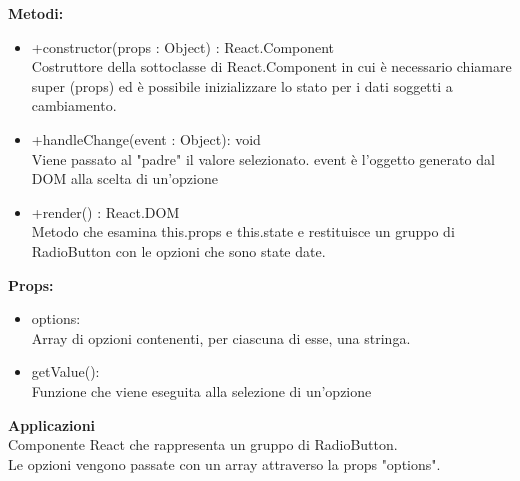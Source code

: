\textbf{Metodi:} 
\begin{itemize}
\item +constructor(props : Object) : React.Component 
\\
Costruttore della sottoclasse di React.Component in cui è necessario chiamare super (props) ed è possibile inizializzare lo stato per i dati soggetti a cambiamento.

\item +handleChange(event : Object): void 
\\
Viene passato al "padre" il valore selezionato. event è l'oggetto generato dal DOM alla scelta di un'opzione

\item +render() : React.DOM 
\\
Metodo che esamina this.props e this.state e restituisce un gruppo di RadioButton con le opzioni che sono state date.

\end{itemize}

\textbf{Props:} 
\begin{itemize}
\item options: 
\\
Array di opzioni contenenti, per ciascuna di esse, una stringa.
\item getValue(): 
\\
Funzione che viene eseguita alla selezione di un'opzione

\end{itemize} 


\textbf{Applicazioni}\\
Componente React che rappresenta un gruppo di RadioButton. \\ Le opzioni vengono passate con un array attraverso la props "options". 


\clearpage

